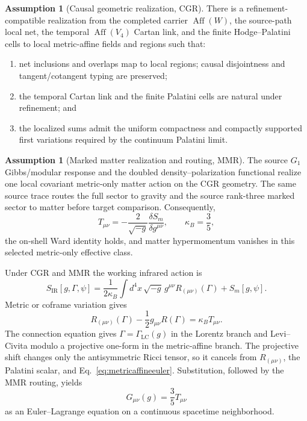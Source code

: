 \documentclass[11pt]{article}
\theoremstyle{definition}
\newtheorem{assumption}[theorem]{Assumption}
\theoremstyle{remark}
\begin{document}
\begin{assumption}[Causal geometric realization, CGR]\label{ass:cgr}
There is a refinement-compatible realization from the completed carrier $\operatorname{Aff}(W)$, the source-path local net, the temporal $\operatorname{Aff}(V_4)$ Cartan link, and the finite Hodge--Palatini cells to local metric-affine fields and regions such that:
\begin{enumerate}[label=(\roman*)]
\item net inclusions and overlaps map to local regions; causal disjointness and tangent/cotangent typing are preserved;
\item the temporal Cartan link and the finite Palatini cells are natural under refinement; and
\item the localized sums admit the uniform compactness and compactly supported first variations required by the continuum Palatini limit.
\end{enumerate}
\end{assumption}

\begin{assumption}[Marked matter realization and routing, MMR]\label{ass:mmr}
The source $G_1$ Gibbs/modular response and the doubled density--polarization functional realize one local covariant metric-only matter action on the CGR geometry. The same source trace routes the full sector to gravity and the source rank-three marked sector to matter before target comparison. Consequently,
\begin{equation}\label{eq:matterstress}
 T_{\mu\nu}=-\frac{2}{\sqrt{-g}}\frac{\delta S_m}{\delta g^{\mu\nu}},
 \qquad \kappa_B=\frac35,
\end{equation}
the on-shell Ward identity holds, and matter hypermomentum vanishes in this selected metric-only effective class.
\end{assumption}

Under CGR and MMR the working infrared action is
\begin{equation}\label{eq:continuumaction}
 S_{\mathrm{IR}}[g,\Gamma,\psi]
 =\frac{1}{2\kappa_B}\int d^4x\,\sqrt{-g}\,
   g^{\mu\nu}R_{(\mu\nu)}(\Gamma)
 +S_m[g,\psi].
\end{equation}
Metric or coframe variation gives
\begin{equation}\label{eq:metricaffineeuler}
 R_{(\mu\nu)}(\Gamma)-\frac12g_{\mu\nu}R(\Gamma)
 =\kappa_B T_{\mu\nu}.
\end{equation}
The connection equation gives $\Gamma=\Gamma_{\mathrm{LC}}(g)$ in the Lorentz branch and Levi--Civita modulo a projective one-form in the metric-affine branch. The projective shift changes only the antisymmetric Ricci tensor, so it cancels from $R_{(\mu\nu)}$, the Palatini scalar, and Eq.~\eqref{eq:metricaffineeuler}. Substitution, followed by the MMR routing, yields
\begin{equation}\label{eq:continuumEinstein}
 \boxed{G_{\mu\nu}(g)=\frac35T_{\mu\nu}}
\end{equation}
as an Euler--Lagrange equation on a continuous spacetime neighborhood.
\end{document}

